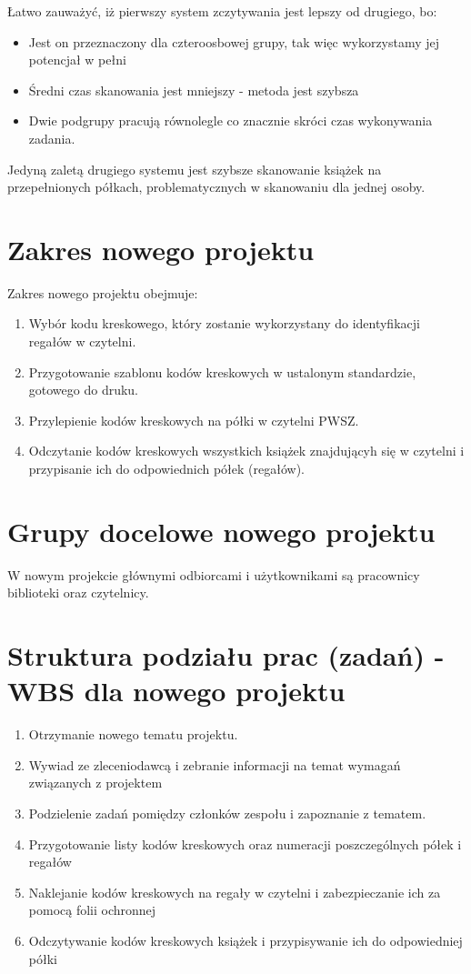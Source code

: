 Łatwo zauważyć, iż pierwszy system zczytywania jest lepszy od drugiego, bo:
\begin{itemize}
\item Jest on przeznaczony dla czteroosbowej grupy, tak więc wykorzystamy jej potencjał w pełni
\item Średni czas skanowania jest mniejszy - metoda jest szybsza
\item Dwie podgrupy pracują równolegle co znacznie skróci czas wykonywania zadania.
\end{itemize}
Jedyną zaletą drugiego systemu jest szybsze skanowanie książek na przepełnionych półkach, problematycznych w skanowaniu dla jednej osoby.

\section{Zakres nowego projektu}
Zakres nowego projektu obejmuje:

\begin{enumerate}
\item Wybór kodu kreskowego, który zostanie wykorzystany do identyfikacji regałów w czytelni. 
\item Przygotowanie szablonu kodów kreskowych w ustalonym standardzie, gotowego do druku.
\item Przylepienie kodów kreskowych na półki w czytelni PWSZ. 
\item Odczytanie kodów kreskowych wszystkich książek znajdującyh się w czytelni i przypisanie ich do odpowiednich półek (regałów).
 \end{enumerate}

\section{Grupy docelowe nowego projektu}

W nowym projekcie głównymi odbiorcami i użytkownikami są pracownicy  biblioteki oraz czytelnicy.

\section{Struktura podziału prac (zadań) - WBS dla nowego projektu}
\begin{enumerate}
\item Otrzymanie nowego tematu projektu.
\item Wywiad ze zleceniodawcą i zebranie informacji na temat wymagań związanych z projektem
\item Podzielenie zadań pomiędzy członków zespołu i zapoznanie z tematem.
\item Przygotowanie listy kodów kreskowych oraz numeracji poszczególnych półek i regałów
\item Naklejanie kodów kreskowych na regały w czytelni i zabezpieczanie ich za pomocą folii ochronnej
\item Odczytywanie kodów kreskowych książek i przypisywanie ich do odpowiedniej półki
\end{enumerate}

